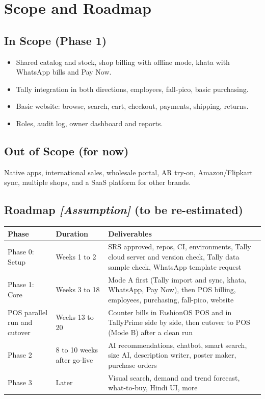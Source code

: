 \documentclass[11pt,a4paper]{article}
\newcommand{\assump}{\textit{[Assumption]}}
\newcommand{\hdr}{\rowcolor{hdrgray}\bfseries}
\begin{document}
\section{Scope and Roadmap}
\subsection{In Scope (Phase 1)}
\begin{itemize}
\item Shared catalog and stock, shop billing with offline mode, khata with WhatsApp bills and Pay Now.
\item Tally integration in both directions, employees, fall-pico, basic purchasing.
\item Basic website: browse, search, cart, checkout, payments, shipping, returns.
\item Roles, audit log, owner dashboard and reports.
\end{itemize}

\subsection{Out of Scope (for now)}
Native apps, international sales, wholesale portal, AR try-on, Amazon/Flipkart sync, multiple shops, and a SaaS platform for other brands.

\subsection{Roadmap \assump{} (to be re-estimated)}
\begin{longtable}{L{3.6cm}L{3.2cm}L{9.7cm}}
\hdr Phase & Duration & Deliverables \\ \endhead
Phase 0: Setup & Weeks 1 to 2 & SRS approved, repos, CI, environments, Tally cloud server and version check, Tally data sample check, WhatsApp template request \\
Phase 1: Core & Weeks 3 to 18 & Mode A first (Tally import and sync, khata, WhatsApp, Pay Now), then POS billing, employees, purchasing, fall-pico, website \\
POS parallel run and cutover & Weeks 13 to 20 & Counter bills in FashionOS POS and in TallyPrime side by side, then cutover to POS (Mode B) after a clean run \\
Phase 2 & 8 to 10 weeks after go-live & AI recommendations, chatbot, smart search, size AI, description writer, poster maker, purchase orders \\
Phase 3 & Later & Visual search, demand and trend forecast, what-to-buy, Hindi UI, more \\
\end{longtable}
\end{document}
